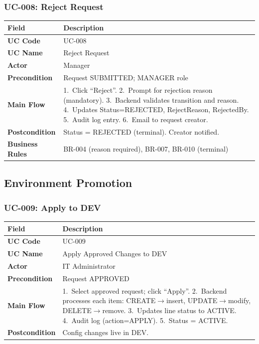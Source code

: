 \documentclass[12pt,a4paper]{report}
\begin{document}
\subsubsection{UC-008: Reject Request}

\begin{longtable}{|>{\bfseries}p{2.8cm}|p{12cm}|}
  \hline
  \rowcolor{tableheadpeach}
  \textbf{Field} & \textbf{Description} \\ \hline
  \endhead \hline \endfoot
  UC Code       & UC-008 \\ \hline
  UC Name       & Reject Request \\ \hline
  Actor         & Manager \\ \hline
  Precondition  & Request SUBMITTED; MANAGER role \\ \hline
  Main Flow     & 1.~Click ``Reject''.
                  2.~Prompt for rejection reason (mandatory).
                  3.~Backend validates transition and reason.
                  4.~Updates Status=REJECTED, RejectReason, RejectedBy.
                  5.~Audit log entry.
                  6.~Email to request creator. \\ \hline
  Postcondition & Status = REJECTED (terminal). Creator notified. \\ \hline
  Business Rules& BR-004 (reason required), BR-007, BR-010 (terminal) \\ \hline
\end{longtable}


\subsection{Environment Promotion}

\subsubsection{UC-009: Apply to DEV}

\begin{longtable}{|>{\bfseries}p{2.8cm}|p{12cm}|}
  \hline
  \rowcolor{tableheadpeach}
  \textbf{Field} & \textbf{Description} \\ \hline
  \endhead \hline \endfoot
  UC Code       & UC-009 \\ \hline
  UC Name       & Apply Approved Changes to DEV \\ \hline
  Actor         & IT Administrator \\ \hline
  Precondition  & Request APPROVED \\ \hline
  Main Flow     & 1.~Select approved request; click ``Apply''.
                  2.~Backend processes each item: CREATE$\rightarrow$insert, UPDATE$\rightarrow$modify, DELETE$\rightarrow$remove.
                  3.~Updates line status to ACTIVE.
                  4.~Audit log (action=APPLY).
                  5.~Status = ACTIVE. \\ \hline
  Postcondition & Config changes live in DEV. \\ \hline
\end{longtable}
\end{document}
